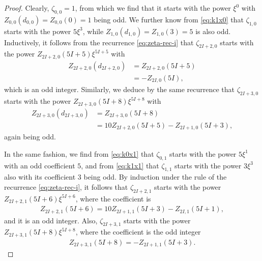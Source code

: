 \documentclass[12pt,reqno]{amsart}
\numberwithin{equation}{section}
\theoremstyle{theorem}
\theoremstyle{definition}
\begin{document}
\begin{proof}
	Clearly, $\zeta_{0,0} = 1$, from which we find that it starts with the power $\xi^{0}$ with $Z_{0,0}(d_{0,0}) = Z_{0,0}(0) = 1$ being odd. We further know from \eqref{eq:k1x0} that $\zeta_{1,0}$ starts with the power $5\xi^{3}$, while $Z_{1,0}(d_{1,0}) = Z_{1,0}(3) = 5$ is also odd. Inductively, it follows from the recurrence \eqref{eq:zeta-rec-i} that $\zeta_{2I+2,0}$ starts with the power $Z_{2I+2,0}(5I+5)\xi^{5I+5}$ with
	\begin{align*}
		Z_{2I+2,0}(d_{2I+2,0}) &= Z_{2I+2,0}(5I+5)\\
		& = -Z_{2I,0}(5I),
	\end{align*}
	which is an odd integer. Similarly, we deduce by the same recurrence that $\zeta_{2I+3,0}$ starts with the power $Z_{2I+3,0}(5I+8)\xi^{5I+8}$ with
	\begin{align*}
		Z_{2I+3,0}(d_{2I+3,0}) &= Z_{2I+3,0}(5I+8)\\
		& = 10Z_{2I+2,0}(5I+5)-Z_{2I+1,0}(5I+3),
	\end{align*}
	again being odd.
	
	In the same fashion, we find from \eqref{eq:k0x1} that $\zeta_{0,1}$ starts with the power $5\xi^{1}$ with an odd coefficient $5$, and from \eqref{eq:k1x1} that $\zeta_{1,1}$ starts with the power $3\xi^{3}$ also with its coefficient $3$ being odd. By induction under the rule of the recurrence \eqref{eq:zeta-rec-i}, it follows that $\zeta_{2I+2,1}$ starts with the power $Z_{2I+2,1}(5I+6)\xi^{5I+6}$, where the coefficient is
	\begin{align*}
		Z_{2I+2,1}(5I+6) = 10 Z_{2I+1,1}(5I+3) - Z_{2I,1}(5I+1),
	\end{align*}
	and it is an odd integer. Also, $\zeta_{2I+3,1}$ starts with the power $Z_{2I+3,1}(5I+8)\xi^{5I+8}$, where the coefficient is the odd integer
	\begin{align*}
		Z_{2I+3,1}(5I+8) = - Z_{2I+1,1}(5I+3).
	\end{align*}
	

\end{proof}
\end{document}
